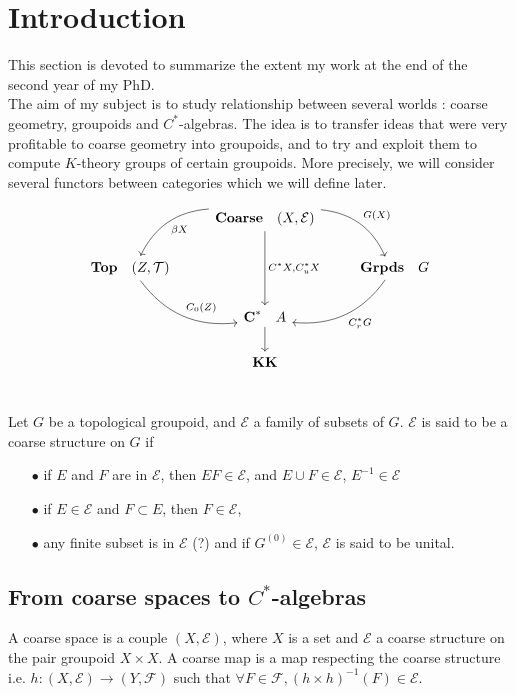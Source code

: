 \section{Introduction}

This section is devoted to summarize the extent my work at the end of the second year of my PhD.\\

The aim of my subject is to study relationship between several worlds : coarse geometry, groupoids and $C^*$-algebras. The idea is to transfer ideas that were very profitable to coarse geometry into groupoids, and to try and exploit them to compute $K$-theory groups of certain groupoids. More precisely, we will consider several functors between categories which we will define later.

\[\begin{tikzcd}
\  & \textbf{Coarse} \quad (X,\mathcal E) \arrow[bend left]{dr}{G(X)} \arrow[bend right]{dl}{\beta X} \arrow{dd}{C^*X,C^*_uX}& \ \\
 \textbf{Top} \quad (Z,\mathcal T) \arrow[bend right]{dr}{C_0(Z)} & \  & \textbf{Grpds}\quad G \arrow[bend left]{dl}{C^*_r G} \\
 \ & \textbf{C}^* \quad A \arrow{d} & \ \\
\ & \textbf{KK} & \ \\
\end{tikzcd}\] 

\begin{definition}
Let $G$ be a topological groupoid, and $\mathcal E$ a family of subsets of $G$. $\mathcal E$ is said to be a coarse structure on $G$ if 
\begin{itemize}
\item[$\bullet$] if $E$ and $F$ are in $\mathcal E$, then $EF\in \mathcal E$, and $E\cup F\in \mathcal E$, $E^{-1}\in \mathcal E$
\item[$\bullet$] if $E\in \mathcal E$ and $F\subset E$, then $F\in \mathcal E$,
\item[$\bullet$] any finite subset is in $\mathcal E$ (?) and if $G^{(0)}\in \mathcal E$, $\mathcal E$ is said to be unital.
\end{itemize}
\end{definition}

\subsection{From coarse spaces to $C^*$-algebras}

\begin{definition}
A coarse space is a couple $(X,\mathcal E)$, where $X$ is a set and $\mathcal E$ a coarse structure on the pair groupoid $X\times X$. A coarse map is a map respecting the coarse structure i.e. $h : (X,\mathcal E)\rightarrow (Y,\mathcal F)$ such that $\forall F\in\mathcal F,(h\times h)^{-1}(F)\in \mathcal E$.
\end{definition}

